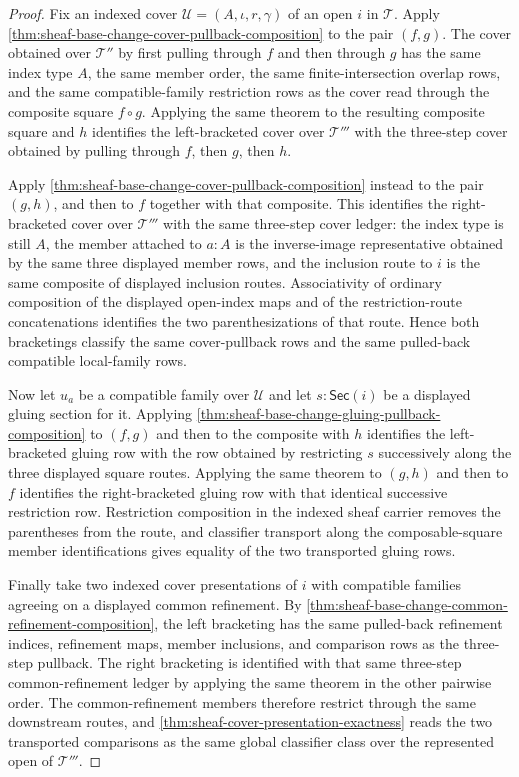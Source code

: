 \begin{proof}
Fix an indexed cover $\mathcal{U}=(A,\iota,r,\gamma)$ of an open $i$ in $\mathcal{T}$. Apply \autoref{thm:sheaf-base-change-cover-pullback-composition} to the pair $(f,g)$. The cover obtained over $\mathcal{T}''$ by first pulling through $f$ and then through $g$ has the same index type $A$, the same member order, the same finite-intersection overlap rows, and the same compatible-family restriction rows as the cover read through the composite square $f\circ g$. Applying the same theorem to the resulting composite square and $h$ identifies the left-bracketed cover over $\mathcal{T}'''$ with the three-step cover obtained by pulling through $f$, then $g$, then $h$.

Apply \autoref{thm:sheaf-base-change-cover-pullback-composition} instead to the pair $(g,h)$, and then to $f$ together with that composite. This identifies the right-bracketed cover over $\mathcal{T}'''$ with the same three-step cover ledger: the index type is still $A$, the member attached to $a:A$ is the inverse-image representative obtained by the same three displayed member rows, and the inclusion route to $i$ is the same composite of displayed inclusion routes. Associativity of ordinary composition of the displayed open-index maps and of the restriction-route concatenations identifies the two parenthesizations of that route. Hence both bracketings classify the same cover-pullback rows and the same pulled-back compatible local-family rows.

Now let $u_a$ be a compatible family over $\mathcal{U}$ and let $s:\mathsf{Sec}(i)$ be a displayed gluing section for it. Applying \autoref{thm:sheaf-base-change-gluing-pullback-composition} to $(f,g)$ and then to the composite with $h$ identifies the left-bracketed gluing row with the row obtained by restricting $s$ successively along the three displayed square routes. Applying the same theorem to $(g,h)$ and then to $f$ identifies the right-bracketed gluing row with that identical successive restriction row. Restriction composition in the indexed sheaf carrier removes the parentheses from the route, and classifier transport along the composable-square member identifications gives equality of the two transported gluing rows.

Finally take two indexed cover presentations of $i$ with compatible families agreeing on a displayed common refinement. By \autoref{thm:sheaf-base-change-common-refinement-composition}, the left bracketing has the same pulled-back refinement indices, refinement maps, member inclusions, and comparison rows as the three-step pullback. The right bracketing is identified with that same three-step common-refinement ledger by applying the same theorem in the other pairwise order. The common-refinement members therefore restrict through the same downstream routes, and \autoref{thm:sheaf-cover-presentation-exactness} reads the two transported comparisons as the same global classifier class over the represented open of $\mathcal{T}'''$.
\end{proof}
